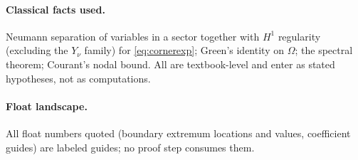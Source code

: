 \documentclass[11pt]{article}
\begin{document}
\paragraph{Classical facts used.}
Neumann separation of variables in a sector together with $H^1$
regularity (excluding the $Y_\nu$ family) for \eqref{eq:cornerexp};
Green's identity on $\Omega$; the spectral theorem; Courant's nodal
bound. All are textbook-level and enter as stated hypotheses, not as
computations.

\paragraph{Float landscape.}
All float numbers quoted (boundary extremum locations and values,
coefficient guides) are labeled guides; no proof step consumes them.
\end{document}
